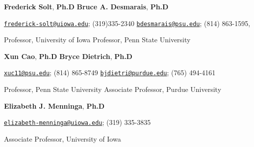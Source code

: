 \documentclass[10.5pt,]{article}
\providecommand{\tightlist}{%
	\setlength{\itemsep}{0pt}\setlength{\parskip}{0pt}}
\renewenvironment{itemize}{
	\begin{list}{}{
			\setlength{\leftmargin}{1.5em}
		}
	}{
	\end{list}
}
\begin{document}
\begin{itemize}
\tightlist
\item
  \textbf{Frederick Solt}, \textbf{Ph.D} \hfill \textbf{Bruce A.
  Desmarais}, \textbf{Ph.D}
\item
  \href{mailto:frederick-solt@uiowa.edu}{\nolinkurl{frederick-solt@uiowa.edu}};
  (319)335-2340
  \hfill  \href{mailto:bdesmarais@psu.edu}{\nolinkurl{bdesmarais@psu.edu}};
  (814) 863-1595,
\item
  Professor, University of Iowa \hfill  Professor, Penn State University
\item
  \textbf{Xun Cao}, \textbf{Ph.D} \hfill \textbf{Bryce Dietrich},
  \textbf{Ph.D}
\item
  \href{mailto:xuc11@psu.edu}{\nolinkurl{xuc11@psu.edu}}; (814) 865-8749
  \hfill  \href{mailto:bjdietri@purdue.edu}{\nolinkurl{bjdietri@purdue.edu}};
  (765) 494-4161
\item
  Professor, Penn State University \hfill Associate Professor, Purdue
  University
\item
  \textbf{Elizabeth J. Menninga}, \textbf{Ph.D}
\item
  \href{mailto:elizabeth-menninga@uiowa.edu}{\nolinkurl{elizabeth-menninga@uiowa.edu}};
  (319) 335-3835
\item
  Associate Professor, University of Iowa
\end{itemize}
	
			
\end{document}
